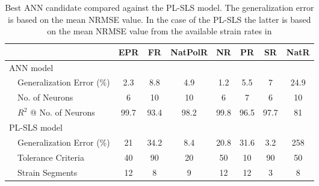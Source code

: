 \begin{table}[htb!]
    \centering
    \caption{Best ANN candidate compared against the PL-SLS model. The generalization error is based on the mean NRMSE value. In the case of the PL-SLS the latter is based on the mean NRMSE value from the available strain rates in }
    \begin{tabular}{p{1em} l ccccccc}
    \toprule
                    &                   & EPR   & FR    & NatPolR & NR  & PR    & SR    & NatR\\
    \hline
    \multicolumn{9}{l}{ANN model}\\
    &Generalization Error (\%)          & 2.3   & 8.8   & 4.9   & 1.2   &5.5    & 7     &   24.9\\
    &No. of Neurons                     & 6     & 10    & 10    & 6     &7      & 6     &   10\\
    &$R^2$ @ No. of Neurons             & 99.7  & 93.4  & 98.2  & 99.8  &96.5   & 97.7  &   81\\
    \midrule
    \multicolumn{9}{l}{PL-SLS model}\\
    &Generalization Error (\%)          & 21    & 34.2  & 8.4   & 20.8  & 31.6  & 3.2   & 258\\
    &Tolerance Criteria                 & 40    & 90    & 20    & 50    & 10    & 90    & 50\\
    &Strain Segments                    & 12    & 8     & 9     & 12    & 12    & 3     & 8\\
    \bottomrule
    \end{tabular}
    \label{tbl:ANNvsSLS}
\end{table}




